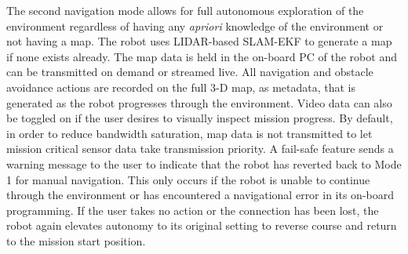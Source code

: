 
The second navigation mode allows for full autonomous exploration of the environment regardless of having any \emph{apriori} knowledge of the environment or not having a map. The robot uses LIDAR-based SLAM-EKF \cite{weingarten2005ekf, castellanos2007robocentric} to generate a map if none exists already. The map data is held in the on-board PC of the robot and can be transmitted on demand or streamed live. All navigation and obstacle avoidance actions are recorded on the full 3-D map, as metadata, that is generated as the robot progresses through the environment. Video data can also be toggled on if the user desires to visually inspect mission progress. By default, in order to reduce bandwidth saturation, map data is not transmitted to let mission critical sensor data take transmission priority.  A fail-safe feature sends a warning message to the user to indicate that the robot has reverted back to Mode 1 for manual navigation. This only occurs if the robot is unable to continue through the environment or has encountered a navigational error in its on-board programming. If the user takes no action or the connection has been lost, the robot again elevates autonomy to its original setting to reverse course and return to the mission start position. 

